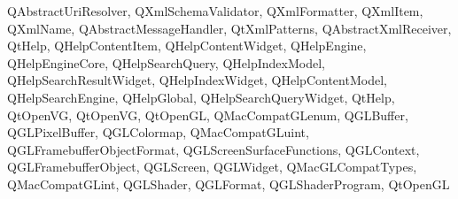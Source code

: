 {{    QAbstractUriResolver,%
    QXmlSchemaValidator,%
    QXmlFormatter,%
    QXmlItem,%
    QXmlName,%
    QAbstractMessageHandler,%
    QtXmlPatterns,%
    QAbstractXmlReceiver,%
    QtHelp,%
    QHelpContentItem,%
    QHelpContentWidget,%
    QHelpEngine,%
    QHelpEngineCore,%
    QHelpSearchQuery,%
    QHelpIndexModel,%
    QHelpSearchResultWidget,%
    QHelpIndexWidget,%
    QHelpContentModel,%
    QHelpSearchEngine,%
    QHelpGlobal,%
    QHelpSearchQueryWidget,%
    QtHelp,%
    QtOpenVG,%
    QtOpenVG,%
    QtOpenGL,%
    QMacCompatGLenum,%
    QGLBuffer,%
    QGLPixelBuffer,%
    QGLColormap,%
    QMacCompatGLuint,%
    QGLFramebufferObjectFormat,%
    QGLScreenSurfaceFunctions,%
    QGLContext,%
    QGLFramebufferObject,%
    QGLScreen,%
    QGLWidget,%
    QMacGLCompatTypes,%
    QMacCompatGLint,%
    QGLShader,%
    QGLFormat,%
    QGLShaderProgram,%
    QtOpenGL%
  }
}
